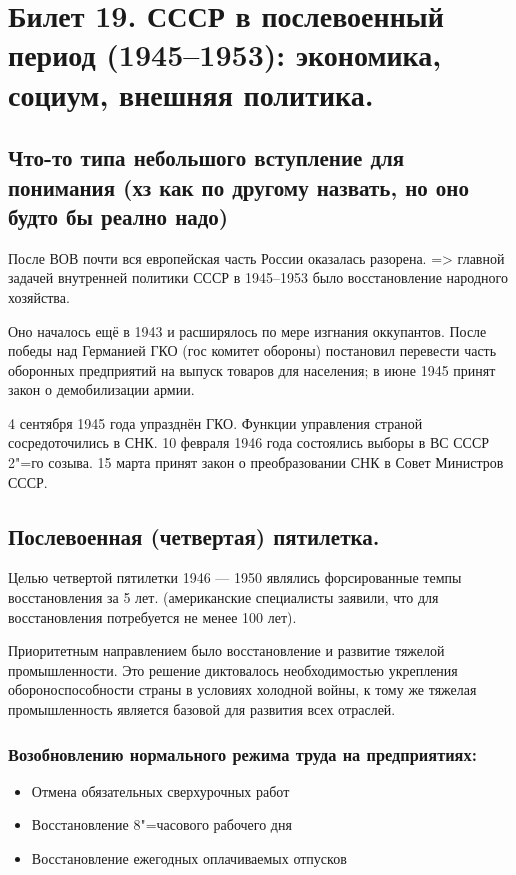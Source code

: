 \section{Билет 19. СССР в послевоенный период (1945--1953): экономика, социум, внешняя политика.}

\subsection{Что-то типа небольшого вступление для понимания (хз как по другому назвать, но оно будто бы реално надо)}

После ВОВ почти вся европейская часть России оказалась разорена. => главной задачей внутренней политики СССР в 1945--1953 было восстановление народного хозяйства.

Оно началось ещё в 1943 и расширялось по мере изгнания оккупантов. После победы над Германией ГКО (гос комитет обороны) постановил перевести часть оборонных предприятий на выпуск товаров для населения; в июне 1945 принят закон о демобилизации армии.

4 сентября 1945 года упразднён ГКО. Функции управления страной сосредоточились в СНК. 10 февраля 1946 года состоялись выборы в ВС СССР 2"=го созыва. 15 марта принят закон о преобразовании СНК в Совет Министров СССР.

\subsection{Послевоенная (четвертая) пятилетка.}

Целью четвертой пятилетки 1946 — 1950 являлись форсированные темпы восстановления за 5 лет. (американские специалисты заявили, что для восстановления потребуется не менее 100 лет). 

Приоритетным направлением было восстановление и развитие тяжелой промышленности. Это решение диктовалось необходимостью укрепления обороноспособности страны в условиях холодной войны, к тому же тяжелая промышленность является базовой для развития всех отраслей. 

\subsubsection{\textbf{Возобновлению нормального режима труда на предприятиях:}}

\begin{itemize}
    \item Отмена обязательных сверхурочных работ 
    \item Восстановление 8"=часового рабочего дня
    \item Восстановление ежегодных оплачиваемых отпусков
\end{itemize}

